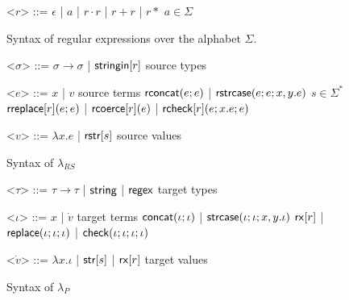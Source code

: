 \documentclass[11pt,leqno]{article}
\theoremstyle{definition}
\newcommand{\lambdap}{\lambda_P}
\newcommand{\sisubst}[3]{{\sf rreplace}[#1](#2;#3)} \newcommand{\rreplace}[3]{{\sf rreplace}[#1](#2;#3)} %
\newcommand{\rcoerce}[2]{{\sf rcoerce}[#1](#2)}
\newcommand{\sistr}[1]{{\sf rstr}[#1]}   \newcommand{\rstr}[1]{{\sf rstr}[#1]} %
\newcommand{\rcheck}[4]{ {\sf rcheck}[#1](#2;#3;#4) }
\newcommand{\strin}[1]{\sistr{#1}}
\newcommand{\rsconcat}[2]{{\sf rconcat}(#1;#2)} \newcommand{\rconcat}[2]{{\sf rconcat}(#1;#2)} %
\newcommand{\stringin}[1]{{\sf stringin}[#1]}
\newcommand{\tcheck}[4]{{\sf check}(#1; #2; #3; #4)}
\renewcommand{\tstr}[1]{{{\sf str}[#1]}}
\newcommand{\preplace}[3]{{\sf replace}(#1;#2;#3)}
\newcommand{\tconcat}[2]{{\sf concat}(#1;#2)} \newcommand{\concat}[2]{{\sf concat}(#1;#2)} %
\newcommand{\rx}[1]{ {\sf rx}[#1] }
\newcommand{\str}{{\sf string}}
\newcommand{\regex}{{\sf regex}}
\newcommand{\strcase}[3]{ {\sf rstrcase}(#1; #2; #3)}
\newcommand{\pstrcase}[3]{ {\sf strcase}(#1; #2; #3)}
\begin{document}









\clearpage
\renewcommand{\grammarlabel}[2]{#1\hfill#2}
\begin{figure}[b]
\small
  \begin{grammar}
<$r$> ::= $\epsilon$ | $a$ | $r \cdot r$ | $r + r$ | $r*$ \hfill $a \in \Sigma$

\caption[Syntax of Regular Expressions]{Syntax of regular expressions over the alphabet $\Sigma$.}
\label{fig:regex}
\end{grammar}
\end{figure}
\begin{figure}[t]
\small
  \begin{grammar}
<$\sigma$> ::=  $\sigma \rightarrow \sigma$ | $\stringin{r}$    \hfill  source types

<$e$> ::= 
      $x$ | $v$ \hfill source terms \alt 
      $\rsconcat{e}{e}$ | $\strcase{e}{e}{x,y.e}$ \hfill $s \in \Sigma^{*}$ \alt
      $\sisubst{r}{e}{e}$ | $\rcoerce{r}{e}$ | $\rcheck{r}{e}{x.e}{e}$

<$v$> ::= $\lambda x . e$ | $\strin{s}$ \hfill source values 
\caption{Syntax of $\lambda_{RS}$}
\label{fig:glambdas}
\end{grammar}
\end{figure}


\renewcommand{\grammarlabel}[2]{#1\hfill#2}

\begin{figure}[t]
\small
  \begin{grammar}

<$\tau$> ::= $\tau \rightarrow \tau$ | $\str$ | $\regex$ \hfill target types

<$\iota$> ::= $x$ | $\dot{v}$ \hfill target terms \alt
$\tconcat{\iota}{\iota}$ | $\pstrcase{\iota}{\iota}{x,y.\iota}$ \alt
  $\rx{r}$ | $\preplace{\iota}{\iota}{\iota}$ | $\tcheck{\iota}{\iota}{\iota}{\iota}$ 

  <$\dot{v}$> ::= $\lambda x . \iota$ | $\tstr{s}$ | $\rx{r}$ \hfill target values

\end{grammar}
\caption{Syntax of $\lambdap$}
\label{fig:lcsSyntax}
\end{figure}
\end{document}
